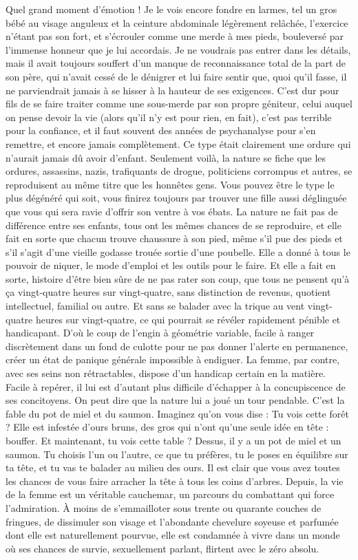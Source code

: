Quel grand moment d’émotion ! Je le vois encore fondre en larmes, tel un gros bébé au visage anguleux et la ceinture abdominale légèrement relâchée, l’exercice n’étant pas son fort, et s’écrouler comme une merde à mes pieds, bouleversé par l’immense honneur que je lui accordais. Je ne voudrais pas entrer dans les détails, mais il avait toujours souffert d’un manque de reconnaissance total de la part de son père, qui n’avait cessé de le dénigrer et lui faire sentir que, quoi qu’il fasse, il ne parviendrait jamais à se hisser à la hauteur de ses exigences. C’est dur pour fils de se faire traiter comme une sous-merde par son propre géniteur, celui auquel on pense devoir la vie (alors qu’il n’y est pour rien, en fait), c’est pas terrible pour la confiance, et il faut souvent des années de psychanalyse pour s’en remettre, et encore jamais complètement. Ce type était clairement une ordure qui n’aurait jamais dû avoir d’enfant. Seulement voilà, la nature se fiche que les ordures, assassins, nazis, trafiquants de drogue, politiciens corrompus et autres, se reproduisent au même titre que les honnêtes gens. Vous pouvez être le type le plus dégénéré qui soit, vous finirez toujours par trouver une fille aussi déglinguée que vous qui sera ravie d’offrir son ventre à vos ébats. La nature ne fait pas de différence entre ses enfants, tous ont les mêmes chances de se reproduire, et elle fait en sorte que chacun trouve chaussure à son pied, même s’il pue des pieds et s’il s’agit d’une vieille godasse trouée sortie d’une poubelle. Elle a donné à tous le pouvoir de niquer, le mode d’emploi et les outils pour le faire. Et elle a fait en sorte, histoire d’être bien sûre de ne pas rater son coup, que tous ne pensent qu’à ça vingt-quatre heures sur vingt-quatre, sans distinction de revenus, quotient intellectuel, familial ou autre. Et sans se balader avec la trique au vent vingt-quatre heures sur vingt-quatre, ce qui pourrait se révéler rapidement pénible et handicapant. D’où le coup de l’engin à géométrie variable, facile à ranger discrètement dans un fond de culotte pour ne pas donner l’alerte en permanence, créer un état de panique générale impossible à endiguer. La femme, par contre, avec ses seins non rétractables, dispose d’un handicap certain en la matière. Facile à repérer, il lui est d’autant plus difficile d’échapper à la concupiscence de ses concitoyens. On peut dire que la nature lui a joué un tour pendable. C’est la fable du pot de miel et du saumon. Imaginez qu’on vous dise : Tu vois cette forêt ? Elle est infestée d’ours bruns, des gros qui n’ont qu’une seule idée en tête : bouffer. Et maintenant, tu vois cette table ? Dessus, il y a un pot de miel et un saumon. Tu choisis l’un ou l’autre, ce que tu préfères, tu le poses en équilibre sur ta tête, et tu vas te balader au milieu des ours. Il est clair que vous avez toutes les chances de vous faire arracher la tête à tous les coins d’arbres. Depuis, la vie de la femme est un véritable cauchemar, un parcours du combattant qui force l’admiration. À moins de s’emmailloter sous trente ou quarante couches de fringues, de dissimuler son visage et l’abondante chevelure soyeuse et parfumée dont elle est naturellement pourvue, elle est condamnée à vivre dans un monde où ses chances de survie, sexuellement parlant, flirtent avec le zéro absolu. 